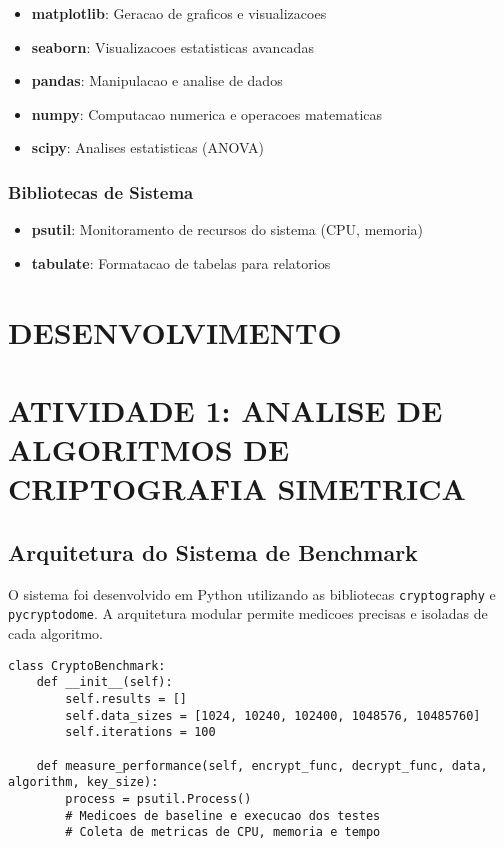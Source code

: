 \documentclass[12pt,a4paper,oneside]{article}
\begin{document}
\begin{itemize}
    \item \textbf{matplotlib}: Geracao de graficos e visualizacoes
    \item \textbf{seaborn}: Visualizacoes estatisticas avancadas
    \item \textbf{pandas}: Manipulacao e analise de dados
    \item \textbf{numpy}: Computacao numerica e operacoes matematicas
    \item \textbf{scipy}: Analises estatisticas (ANOVA)
\end{itemize}

\subsubsection{Bibliotecas de Sistema}

\begin{itemize}
    \item \textbf{psutil}: Monitoramento de recursos do sistema (CPU, memoria)
    \item \textbf{tabulate}: Formatacao de tabelas para relatorios
\end{itemize}

\section{DESENVOLVIMENTO}

\section{ATIVIDADE 1: ANALISE DE ALGORITMOS DE CRIPTOGRAFIA SIMETRICA}

\subsection{Arquitetura do Sistema de Benchmark}

O sistema foi desenvolvido em Python utilizando as bibliotecas \texttt{cryptography} e \texttt{pycryptodome}. A arquitetura modular permite medicoes precisas e isoladas de cada algoritmo.

\begin{lstlisting}[caption=Estrutura principal da classe CryptoBenchmark]
class CryptoBenchmark:
    def __init__(self):
        self.results = []
        self.data_sizes = [1024, 10240, 102400, 1048576, 10485760]
        self.iterations = 100
    
    def measure_performance(self, encrypt_func, decrypt_func, data, algorithm, key_size):
        process = psutil.Process()
        # Medicoes de baseline e execucao dos testes
        # Coleta de metricas de CPU, memoria e tempo
\end{lstlisting}
\end{document}

